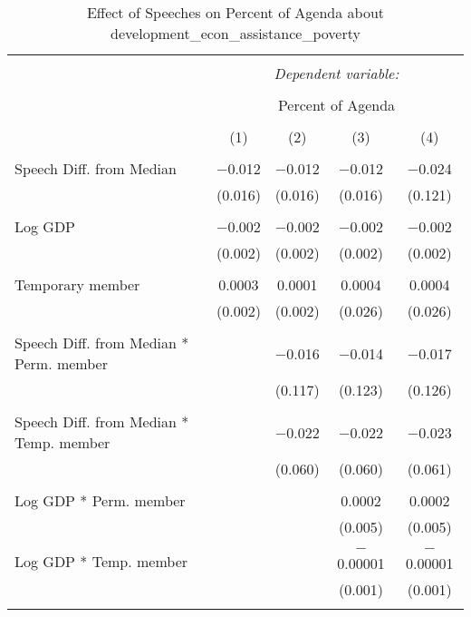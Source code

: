 
\begin{table}[!htbp] \centering 
  \caption{Effect of Speeches on Percent of Agenda about  development_econ_assistance_poverty} 
  \label{} 
\begin{tabular}{@{\extracolsep{5pt}}lcccc} 
\\[-1.8ex]\hline 
\hline \\[-1.8ex] 
 & \multicolumn{4}{c}{\textit{Dependent variable:}} \\ 
\cline{2-5} 
\\[-1.8ex] & \multicolumn{4}{c}{Percent of Agenda} \\ 
\\[-1.8ex] & (1) & (2) & (3) & (4)\\ 
\hline \\[-1.8ex] 
 Speech Diff. from Median & $-$0.012 & $-$0.012 & $-$0.012 & $-$0.024 \\ 
  & (0.016) & (0.016) & (0.016) & (0.121) \\ 
  & & & & \\ 
 Log GDP & $-$0.002 & $-$0.002 & $-$0.002 & $-$0.002 \\ 
  & (0.002) & (0.002) & (0.002) & (0.002) \\ 
  & & & & \\ 
 Temporary member & 0.0003 & 0.0001 & 0.0004 & 0.0004 \\ 
  & (0.002) & (0.002) & (0.026) & (0.026) \\ 
  & & & & \\ 
 Speech Diff. from Median * Perm. member &  & $-$0.016 & $-$0.014 & $-$0.017 \\ 
  &  & (0.117) & (0.123) & (0.126) \\ 
  & & & & \\ 
 Speech Diff. from Median * Temp. member &  & $-$0.022 & $-$0.022 & $-$0.023 \\ 
  &  & (0.060) & (0.060) & (0.061) \\ 
  & & & & \\ 
 Log GDP * Perm. member &  &  & 0.0002 & 0.0002 \\ 
  &  &  & (0.005) & (0.005) \\ 
  & & & & \\ 
 Log GDP * Temp. member &  &  & $-$0.00001 & $-$0.00001 \\ 
  &  &  & (0.001) & (0.001) \\ 
  & & & & \\ 

\end{tabular}
\end{table}
